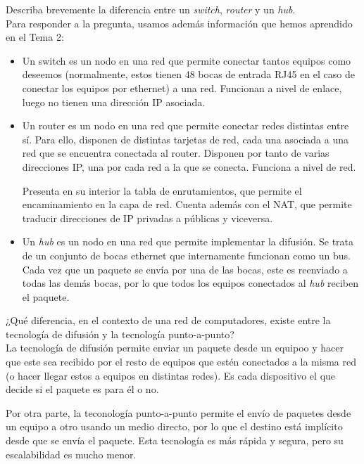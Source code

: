 \begin{ejercicio}
    Describa brevemente la diferencia entre un \textit{switch}, \textit{router} y un \textit{hub}.\\

    Para responder a la pregunta, usamos además información que hemos aprendido en el Tema 2:
    \begin{itemize}
        \item Un switch es un nodo en una red que permite conectar tantos equipos como deseemos (normalmente, estos tienen 48 bocas de entrada RJ45 en el caso de conectar los equipos por ethernet) a una red. Funcionan a nivel de enlace, luego no tienen una dirección IP asociada.
        \item Un router es un nodo en una red que permite conectar redes distintas entre sí. Para ello, disponen de distintas tarjetas de red, cada una asociada a una red que se encuentra conectada al router. Disponen por tanto de varias direcciones IP, una por cada red a la que se conecta. Funciona a nivel de red.

            Presenta en su interior la tabla de enrutamientos, que permite el encaminamiento en la capa de red. Cuenta además con el NAT, que permite traducir direcciones de IP privadas a públicas y viceversa.
        \item Un \textit{hub} es un nodo en una red que permite implementar la difusión. Se trata de un conjunto de bocas ethernet que internamente funcionan como un bus. Cada vez que un paquete se envía por una de las bocas, este es reenviado a todas las demás bocas, por lo que todos los equipos conectados al \textit{hub} reciben el paquete.
    \end{itemize}
\end{ejercicio}

\begin{ejercicio}
    ¿Qué diferencia, en el contexto de una red de computadores, existe entre la tecnología de difusión y la tecnología punto-a-punto?\\

    La tecnología de difusión permite enviar un paquete desde un equipoo y hacer que este sea recibido por el resto de equipos que estén conectados a la misma red (o hacer llegar estos a equipos en distintas redes).
    Es cada dispositivo el que decide si el paquete es para él o no.

    Por otra parte, la teconología punto-a-punto permite el envío de paquetes desde un equipo a otro usando un medio directo, por lo que el destino está implícito desde que se envía el paquete.
    Esta tecnología es más rápida y segura, pero su escalabilidad es mucho menor.
\end{ejercicio}

